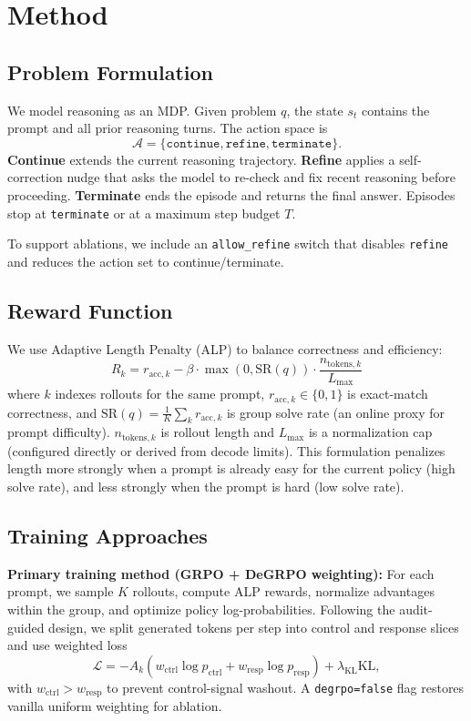 \documentclass{article}
\begin{document}
\section{Method}

\subsection{Problem Formulation}

We model reasoning as an MDP. Given problem $q$, the state $s_t$ contains the prompt and all prior reasoning turns. The action space is
\[
\mathcal{A}=\{\texttt{continue},\texttt{refine},\texttt{terminate}\}.
\]
\textbf{Continue} extends the current reasoning trajectory. \textbf{Refine} applies a self-correction nudge that asks the model to re-check and fix recent reasoning before proceeding. \textbf{Terminate} ends the episode and returns the final answer. Episodes stop at \texttt{terminate} or at a maximum step budget $T$.

To support ablations, we include an \texttt{allow\_refine} switch that disables \texttt{refine} and reduces the action set to continue/terminate.

\subsection{Reward Function}

We use Adaptive Length Penalty (ALP) to balance correctness and efficiency:
\begin{equation}
    R_k = r_{\text{acc},k} - \beta \cdot \max(0,\mathrm{SR}(q)) \cdot \frac{n_{\text{tokens},k}}{L_{\max}}
\end{equation}
where $k$ indexes rollouts for the same prompt, $r_{\text{acc},k}\in\{0,1\}$ is exact-match correctness, and $\mathrm{SR}(q)=\frac{1}{K}\sum_k r_{\text{acc},k}$ is group solve rate (an online proxy for prompt difficulty). $n_{\text{tokens},k}$ is rollout length and $L_{\max}$ is a normalization cap (configured directly or derived from decode limits). This formulation penalizes length more strongly when a prompt is already easy for the current policy (high solve rate), and less strongly when the prompt is hard (low solve rate).

\subsection{Training Approaches}

\textbf{Primary training method (GRPO + DeGRPO weighting):} For each prompt, we sample $K$ rollouts, compute ALP rewards, normalize advantages within the group, and optimize policy log-probabilities. Following the audit-guided design, we split generated tokens per step into control and response slices and use weighted loss
\[
\mathcal{L}=-A_k\left(w_{\text{ctrl}}\log p_{\text{ctrl}} + w_{\text{resp}}\log p_{\text{resp}}\right)+\lambda_{\text{KL}}\mathrm{KL},
\]
with $w_{\text{ctrl}}>w_{\text{resp}}$ to prevent control-signal washout. A \texttt{degrpo=false} flag restores vanilla uniform weighting for ablation.
\end{document}
